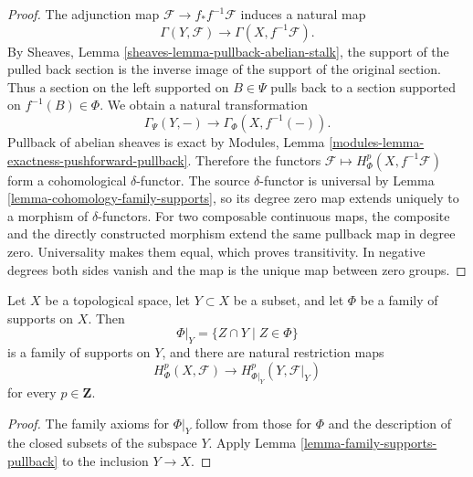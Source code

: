 \begin{proof}
The adjunction map $\mathcal{F} \to f_*f^{-1}\mathcal{F}$ induces a
natural map
$$
\Gamma(Y, \mathcal{F}) \longrightarrow
\Gamma(X, f^{-1}\mathcal{F}).
$$
By Sheaves, Lemma \ref{sheaves-lemma-pullback-abelian-stalk}, the support
of the pulled back section is the inverse image of the support of the
original section. Thus a section on the left supported on $B \in \Psi$
pulls back to a section supported on $f^{-1}(B) \in \Phi$. We obtain a
natural transformation
$$
\Gamma_\Psi(Y, -) \longrightarrow
\Gamma_\Phi(X, f^{-1}(-)).
$$
Pullback of abelian sheaves is exact by Modules, Lemma
\ref{modules-lemma-exactness-pushforward-pullback}. Therefore the functors
$\mathcal{F} \mapsto H^p_\Phi(X, f^{-1}\mathcal{F})$ form a
cohomological $\delta$-functor. The source $\delta$-functor is universal
by Lemma \ref{lemma-cohomology-family-supports}, so its degree zero map
extends uniquely to a morphism of $\delta$-functors. For two composable
continuous maps, the composite and the directly constructed morphism
extend the same pullback map in degree zero. Universality makes them equal,
which proves transitivity. In negative degrees both sides vanish and the
map is the unique map between zero groups.
\end{proof}

\begin{lemma}
\label{lemma-family-supports-restriction}
\begin{reference}
\cite[Chapter III, \S 3.2, p. 158]{Tohoku}
\end{reference}
Let $X$ be a topological space, let $Y \subset X$ be a subset, and let
$\Phi$ be a family of supports on $X$. Then
$$
\Phi|_Y = \{Z \cap Y \mid Z \in \Phi\}
$$
is a family of supports on $Y$, and there are natural restriction maps
$$
H^p_\Phi(X, \mathcal{F}) \longrightarrow
H^p_{\Phi|_Y}(Y, \mathcal{F}|_Y)
$$
for every $p \in \mathbf{Z}$.
\end{lemma}

\begin{proof}
The family axioms for $\Phi|_Y$ follow from those for $\Phi$ and the
description of the closed subsets of the subspace $Y$. Apply Lemma
\ref{lemma-family-supports-pullback} to the inclusion $Y \to X$.
\end{proof}

